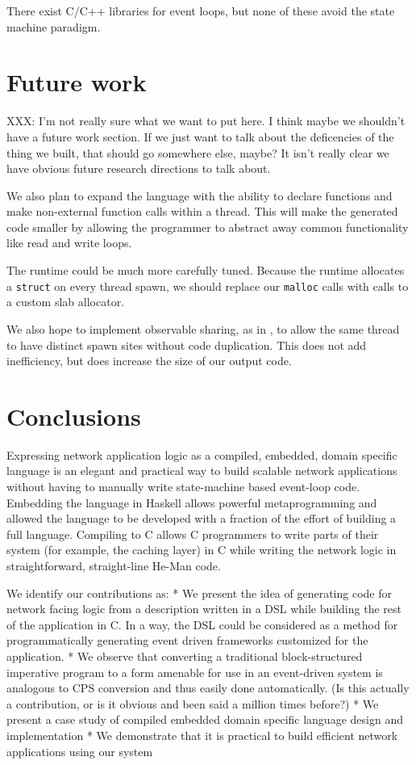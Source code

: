 \documentclass[preprint]{sigplanconf}
\renewcommand{\t}{\texttt}
\begin{document}
There exist C/C++ libraries for event loops\cite{libevent}, but none of these
avoid the state machine paradigm.

\section{Future work}

XXX: I'm not really sure what we want to put here. I think maybe we
shouldn't have a future work section. If we just want to talk about
the deficencies of the thing we built, that should go somewhere else,
maybe? It isn't really clear we have obvious future research
directions to talk about.

We also plan to expand the language with the ability to declare
functions and make non-external function calls within a thread. This
will make the generated code smaller by allowing the programmer to
abstract away common functionality like read and write loops.

The runtime could be much more carefully tuned.
Because the runtime allocates a \t{struct} on every thread spawn, we should
replace our \t{malloc} calls with calls to a custom slab allocator.

We also hope to implement observable sharing, as in \cite{Gill}, to allow the
same thread to have distinct spawn sites without code duplication. This does not
add inefficiency, but does increase the size of our output code. 

\section{Conclusions}
Expressing network application logic as a compiled, embedded, domain
specific language is an elegant and practical way to build scalable
network applications without having to manually write state-machine
based event-loop code. Embedding the language in Haskell allows
powerful metaprogramming and allowed the language to be developed with
a fraction of the effort of building a full language. Compiling to C
allows C programmers to write parts of their system (for example, the
caching layer) in C while writing the network logic in
straightforward, straight-line He-Man code.


We identify our contributions as:
* We present the idea of generating code for network facing logic from a
description written in a DSL while building the rest of the application in
C. In a way, the DSL could be considered as a method for programmatically
generating event driven frameworks customized for the application.
* We observe that converting a traditional block-structured imperative
program to a form amenable for use in an event-driven system is analogous
to CPS conversion and thus easily done automatically. (Is this actually a
contribution, or is it obvious and been said a million times before?)
* We present a case study of compiled embedded domain specific language
design and implementation
* We demonstrate that it is practical to build efficient network
applications using our system

\cite{*}

{}

\end{document}
